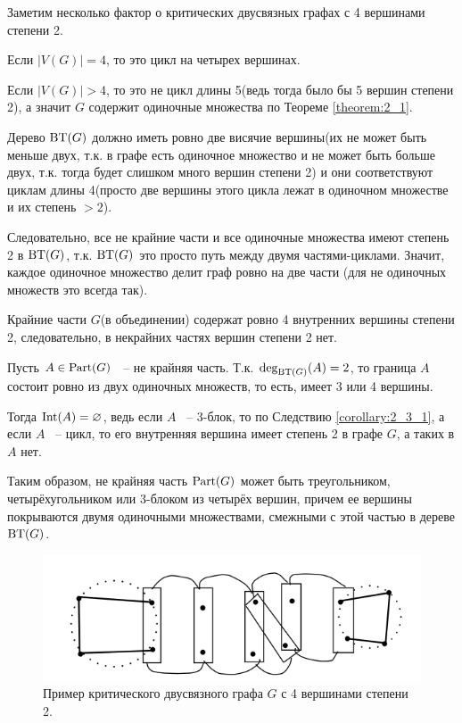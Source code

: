 \begin{claim*}
Заметим несколько фактор о критических двусвязных графах с 4 вершинами степени 2.

Если $|V(G)| = 4$, то это цикл на четырех вершинах.

Если  $|V(G)| > 4$, то это не цикл длины 5(ведь тогда было бы 5 вершин степени 2), а значит  $G$ содержит одиночные множества по Теореме \ref{theorem:2_1}.

Дерево $\operatorname{BT}(G)$ должно иметь ровно две висячие вершины(их не может быть меньше двух, т.к. в графе есть одиночное множество и не может быть больше двух, т.к. тогда будет слишком много вершин степени 2) и они соответствуют циклам длины 4(просто две вершины этого цикла лежат в одиночном множестве и их степень $> 2$).

Следовательно, все не крайние части и все одиночные множества имеют степень 2 в $\operatorname{BT}(G)$, т.к. $\operatorname{BT}(G)$ это просто путь между двумя частями-циклами.
Значит, каждое одиночное множество делит граф ровно на две части (для не одиночных множеств это всегда так).

Крайние части $G$(в объединении) содержат ровно 4 внутренних вершины степени 2, следовательно, в некрайних частях вершин степени 2 нет.

Пусть $A \in \operatorname{Part}(G)$ ~-- не крайняя часть.
Т.к. $\deg_{\operatorname{BT}(G)}(A) = 2$, то граница  $A$ состоит ровно из двух одиночных множеств, то есть, имеет 3 или 4 вершины.

Тогда $\operatorname{Int}(A) = \varnothing$, ведь если  $A$ ~-- 3-блок, то по Следствию \ref{corollary:2_3_1}, а если  $A$ ~-- цикл, то его внутренняя вершина имеет степень 2 в графе $G$, а таких в $A$ нет.

Таким образом, не крайняя часть $\operatorname{Part}(G)$ может быть треугольником, четырёхугольником или 3-блоком из четырёх вершин, причем ее вершины покрываются двумя одиночными множествами, смежными с этой частью в дереве $\operatorname{BT}(G)$.


\begin{figure}[ht]
    \centering
	\includegraphics[width=0.4\columnwidth]{figures/example_2_critical_4_deg_2.png}
    \caption{Пример критического двусвязного графа $G$ с 4 вершинами степени 2.}
    \label{fig:example_2_critical_4_deg_2}
\end{figure}


\end{claim*}



